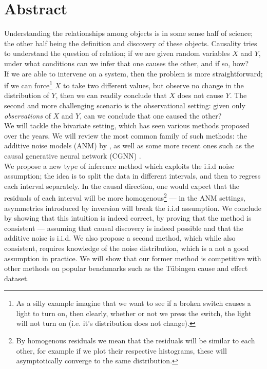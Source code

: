

\cleardoublepage
\chapter*{Abstract}
\vspace{0.05\textheight}

Understanding the relationships among objects is in some sense half of science; the other 
half being the definition and discovery of these objects. Causality tries to understand the question of 
relation; if we are given random variables $X$ and $Y$, under what conditions can we infer that 
one causes the other, and if so, how? \\


If we are able to intervene on a system, then the problem is more straightforward; if we can force\footnote{
As a silly example imagine that we want to see if a broken switch causes a light to turn on, then clearly,
whether or not we press the switch, the light will not turn on (i.e. it's distribution does not change).}
$X$ to take two different values, but observe no change in the distribution of $Y$, then we can readily 
conclude that $X$ does not cause $Y$.
The second and more challenging scenario is the observational setting: given 
only \textit{observations} of $X$ and $Y$, can we conclude that one caused the other? \\

We will tackle the bivariate setting, which has 
seen various methods proposed over the years. We will review the most common family of such methods: 
the additive noise models (ANM) by \cite{Mooij2016jmlr}, as well as some more recent ones such as 
the causal generative neural network (CGNN) \cite{goudet2017causal}. \\

We propose a new type of inference method which exploits the i.i.d 
noise assumption; the idea is to split the data in different intervals, and then to regress each 
interval separately. In the causal direction, one would expect that the residuals of each 
interval will be more homogenous\footnote{By homogenous residuals we mean that the residuals will 
be similar to each other, for example if we plot their respective histograms, these will asymptotically 
converge to the same distribution.} --- in the ANM settings, asymmetries introduced
by inversion will break the i.i.d assumption. We conclude by 
showing that this intuition is indeed correct, by proving that the method is consistent --- 
assuming that causal discovery is indeed possible and that the additive noise is i.i.d. We
also propose a second method, which while also consistent, requires knowledge of the 
noise distribution, which is a not a good assumption in practice. We will show that our former method is competitive with 
other methods on popular benchmarks such as the Tübingen cause and effect dataset. 



